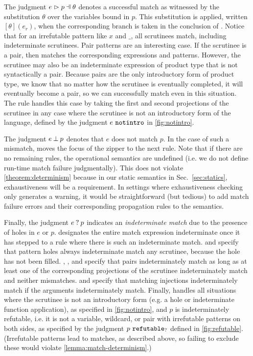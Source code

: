 The judgment $\hpatmatch{e}{p}{\theta}$ denotes a successful match as witnessed by the substitution $\theta$ over the variables bound in $p$. This substitution is applied, written $[\theta](e_r)$, when the corresponding branch is taken in the conclusion of \ITSuccMatch. Notice that for an irrefutable pattern like $x$ and $\_$, all scrutinees match, including indeterminate scrutinees. 
Pair patterns are an interesting case. If the scrutinee is a pair, then \MPair matches the corresponding expressions and patterns. However, the scrutinee may also be an indeterminate expression of product type that is not syntactically a pair. Because pairs are the only introductory form of product type, we know that no matter how the scrutinee is eventually completed, it will eventually become a pair, so we can successfully match even in this situation. %
The \MNotIntroPair rule handles this case by taking the first and second projections of the scrutinee in any case where the scrutinee is not an introductory form of the language, defined by the judgment $e ~\mathtt{notintro}$ in \autoref{fig:notintro}.

The judgment $e \mathbin{\bot} p$ denotes that $e$ does not match $p$. In the case of such a mismatch,
\ITMisMatch moves the focus of the zipper to the next rule. Note that if there are no remaining rules, 
the operational semantics are undefined (i.e. we do not define run-time match failure judgmentally). This does not violate \autoref{theorem:determinism} because
in our static semantics in Sec.~\ref{sec:statics}, exhaustiveness will be a requirement. In settings where exhaustiveness checking
only generates a warning, it would be straightforward (but tedious) to add match failure errors and their corresponding propagation rules to the semantics.



Finally, the judgment $e \mathbin{?} p$ indicates an \emph{indeterminate match} due to the presence of holes in $e$ or $p$. \IMatch designates the entire match expression indeterminate once it has stepped to a rule where there is such an indeterminate match. \MMEHole and \MMHole specify that pattern holes always indeterminate match any scrutinee, because the hole has not been filled. \MMPairL, \MMPairR, and \MMPair specify that pairs indeterminately match as long as at least one of the corresponding projections of the scrutinee indeterminately match and neither mismatches. \MMInl and \MMInr specify that matching injections indeterminately match if the arguments indeterminately match. Finally, \MMNotIntro handles all situations where the scrutinee is not an introductory form (e.g. a hole or indeterminate function application), as specified in \autoref{fig:notintro}, and $p$ is indeterminately refutable, i.e. it is not a variable, wildcard, or pair with irrefutable patterns on both sides, as specified by the judgment $p ~\mathtt{refutable}_?$ defined in \autoref{fig:refutable}. (Irrefutable patterns lead to matches, as described above, so failing to exclude these would violate \autoref{lemma:match-determinism}.)

